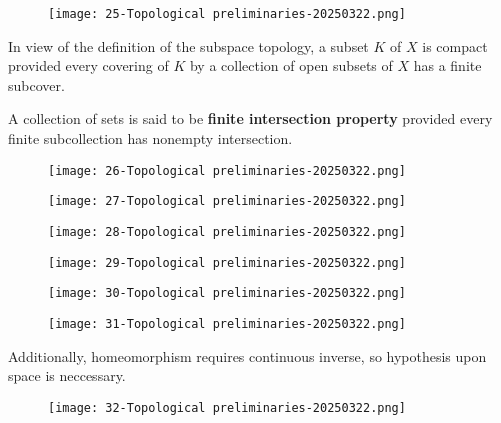 \begin{figure}[H]
\centering
\texttt{[image: 25-Topological preliminaries-20250322.png]}
\label{}
\end{figure}
In view of the definition of the subspace topology, a subset $K$ of $X$ is compact provided every covering of $K$ by a collection of open subsets of $X$ has a finite subcover.

\begin{definition}
A collection of sets is said to be \textbf{finite intersection property} provided every finite subcollection has nonempty intersection.
\end{definition}
\begin{figure}[H]
\centering
\texttt{[image: 26-Topological preliminaries-20250322.png]}
\label{}
\end{figure}

\begin{figure}[H]
\centering
\texttt{[image: 27-Topological preliminaries-20250322.png]}
\label{}
\end{figure}

\begin{figure}[H]
\centering
\texttt{[image: 28-Topological preliminaries-20250322.png]}
\label{}
\end{figure}

\begin{figure}[H]
\centering
\texttt{[image: 29-Topological preliminaries-20250322.png]}
\label{}
\end{figure}

\begin{figure}[H]
\centering
\texttt{[image: 30-Topological preliminaries-20250322.png]}
\label{}
\end{figure}

\begin{figure}[H]
\centering
\texttt{[image: 31-Topological preliminaries-20250322.png]}
\label{}
\end{figure}

Additionally, homeomorphism requires continuous inverse, so hypothesis upon space is neccessary.

\begin{figure}[H]
\centering
\texttt{[image: 32-Topological preliminaries-20250322.png]}
\label{}
\end{figure}

